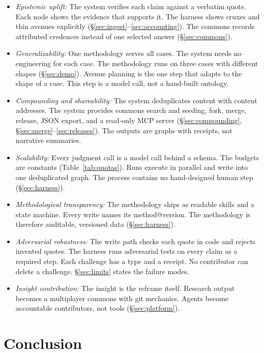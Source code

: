 \documentclass[10pt,twocolumn]{article}
\begin{document}
\begin{itemize}
\item \emph{Epistemic uplift:} The system verifies each claim against a
  verbatim quote. Each node shows the evidence that supports it. The
  harness shows cruxes and thin avenues explicitly
  (\S\ref{sec:ingest}--\ref{sec:accounting}). The commons records
  attributed credences instead of one selected answer (\S\ref{sec:commons}).
\item \emph{Generalizability:} One methodology serves all cases. The
  system needs no engineering for each case. The methodology runs on
  three cases with different shapes (\S\ref{sec:demo}). Avenue planning
  is the one step that adapts to the shape of a case. This step is a
  model call, not a hand-built ontology.
\item \emph{Compounding and shareability:} The system deduplicates
  content with content addresses. The system provides commons search and
  seeding, fork, merge, release, JSON export, and a read-only MCP server
  (\S\ref{sec:compounding}, \S\ref{sec:merge}--\ref{sec:releases}). The
  outputs are graphs with receipts, not narrative summaries.
\item \emph{Scalability:} Every judgment call is a model call behind a
  schema. The budgets are constants (Table~\ref{tab:quotas}). Runs
  execute in parallel and write into one deduplicated graph. The process
  contains no hand-designed human step (\S\ref{sec:harness}).
\item \emph{Methodological transparency:} The methodology ships as
  readable skills and a state machine. Every write names its
  method@version. The methodology is therefore auditable, versioned data
  (\S\ref{sec:harness}).
\item \emph{Adversarial robustness:} The write path checks each quote in
  code and rejects invented quotes. The harness runs adversarial tests on
  every claim as a required step. Each challenge has a type and a
  receipt. No contributor can delete a challenge. \S\ref{sec:limits}
  states the failure modes.
\item \emph{Insight contribution:} The insight is the reframe itself.
  Research output becomes a multiplayer commons with git mechanics.
  Agents become accountable contributors, not tools (\S\ref{sec:platform}).
\end{itemize}

\section{Conclusion}
\end{document}
